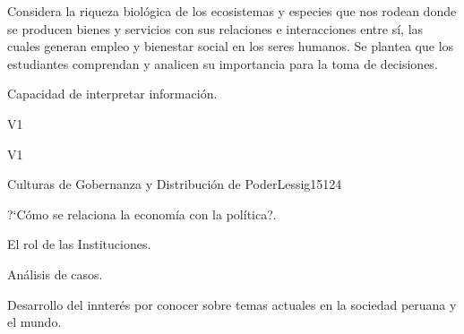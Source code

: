 \begin{syllabus}


\begin{justification}
Considera la riqueza biológica de los ecosistemas y especies que nos rodean donde se producen bienes y servicios con sus relaciones e interacciones entre sí, las cuales generan empleo y bienestar social en los seres humanos. Se plantea que los estudiantes comprendan y analicen su importancia para la toma de decisiones.
\end{justification}

\begin{goals}
\item Capacidad de interpretar información.
\end{goals}

\begin{outcomes}{V1}
    \item {}
    \item {}
    \item {}
    
\end{outcomes}

\begin{competences}{V1}
    \item {}
    \item {}
    \item {}
    \item {}
\end{competences}

\begin{unit}{Culturas de Gobernanza y Distribución de Poder}{}{Lessig15}{12}{4}
   \begin{topics}
      \item ?`Cómo se relaciona la economía con la política?.
      \item El rol de las Instituciones.
      \item Análisis de casos.
   \end{topics}
   \begin{learningoutcomes}
      \item Desarrollo del innterés por conocer sobre temas actuales en la sociedad peruana y el mundo.
   \end{learningoutcomes}
\end{unit}

\begin{coursebibliography}
\end{coursebibliography}

\end{syllabus}
